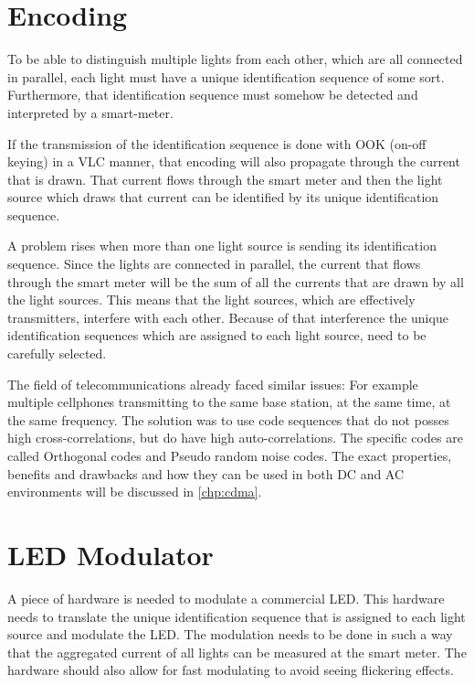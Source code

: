 	\section{Encoding}

	To be able to distinguish multiple lights from each other, which are all connected in parallel, each light must have a unique identification sequence of some sort.
	Furthermore, that identification sequence must somehow be detected and interpreted by a smart-meter.


	If the transmission of the identification sequence is done with OOK (on-off keying) in a VLC manner, that encoding will also propagate through the current that is drawn.
	That current flows through the smart meter and then the light source which draws that current can be identified by its unique identification sequence. 


	A problem rises when more than one light source is sending its identification sequence.
	Since the lights are connected in parallel, the current that flows through the smart meter will be the sum of all the currents that are drawn by all the light sources.
	This means that the light sources, which are effectively transmitters, interfere with each other.
	Because of that interference the unique identification sequences which are assigned to each light source, need to be carefully selected.


	The field of telecommunications already faced similar issues: For example multiple cellphones transmitting to the same base station, at the same time, at the same frequency. 
	The solution was to use code sequences that do not posses high cross-correlations, but do have high auto-correlations.
	The specific codes are called Orthogonal codes and Pseudo random noise codes.
	The exact properties, benefits and drawbacks and how they can be used in both DC and AC environments will be discussed in \autoref{chp:cdma}.




	\section{LED Modulator}

	A piece of hardware is needed to modulate a commercial LED.
	This hardware needs to translate the unique identification sequence that is assigned to each light source and modulate the LED.
	The modulation needs to be done in such a way that the aggregated current of all lights can be measured at the smart meter.  
	The hardware should also allow for fast modulating to avoid seeing flickering effects.


